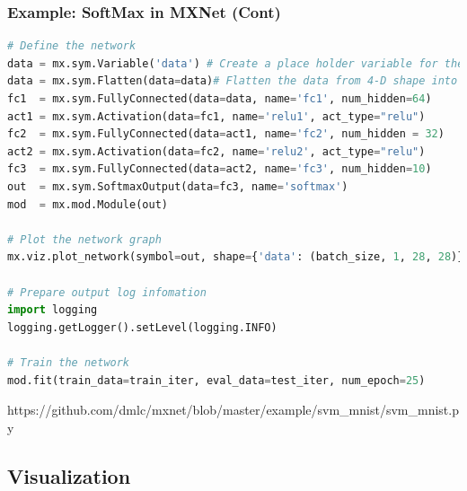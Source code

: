 \begin{frame}[fragile]
  \MyLogo
  \frametitle{Example: SoftMax in MXNet (Cont)}  

\ContinueLineNumber
\scriptsize{
\begin{lstlisting}[language=python]
# Define the network
data = mx.sym.Variable('data') # Create a place holder variable for the input data
data = mx.sym.Flatten(data=data)# Flatten the data from 4-D shape into 2-D
fc1  = mx.sym.FullyConnected(data=data, name='fc1', num_hidden=64) 
act1 = mx.sym.Activation(data=fc1, name='relu1', act_type="relu")
fc2  = mx.sym.FullyConnected(data=act1, name='fc2', num_hidden = 32)
act2 = mx.sym.Activation(data=fc2, name='relu2', act_type="relu")
fc3  = mx.sym.FullyConnected(data=act2, name='fc3', num_hidden=10)
out  = mx.sym.SoftmaxOutput(data=fc3, name='softmax')
mod  = mx.mod.Module(out)

# Plot the network graph
mx.viz.plot_network(symbol=out, shape={'data': (batch_size, 1, 28, 28)}).view()

# Prepare output log infomation
import logging
logging.getLogger().setLevel(logging.INFO)

# Train the network
mod.fit(train_data=train_iter, eval_data=test_iter, num_epoch=25)

\end{lstlisting}
}

\vskip 50pt

\begin{center}
{\color{red}\scriptsize
https://github.com/dmlc/mxnet/blob/master/example/svm\_mnist/svm\_mnist.py
}
\end{center}

\end{frame}

\subsection{Visualization}

